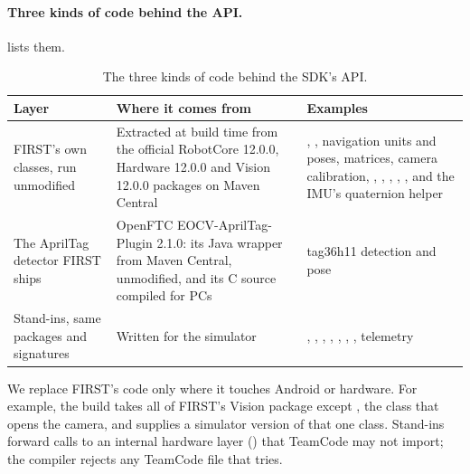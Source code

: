 \documentclass[10pt,twocolumn,letterpaper]{article}
\begin{document}
\paragraph{Three kinds of code behind the API.}  lists them.

\begin{table}[t]
\centering
\small
\caption{The three kinds of code behind the SDK's API.}\label{tab:layers}
\begin{tabularx}{\textwidth}{@{}>{\raggedright\arraybackslash}p{4.2cm}>{\raggedright\arraybackslash}p{5.0cm}L@{}}
\toprule
\textbf{Layer} & \textbf{Where it comes from} & \textbf{Examples} \\
\midrule
FIRST's own classes, run unmodified & Extracted at build time from the official RobotCore 12.0.0, Hardware 12.0.0 and Vision 12.0.0 packages on Maven Central & , , navigation units and poses, matrices, camera calibration, , , , , ,  and the IMU's quaternion helper \\
The AprilTag detector FIRST ships & OpenFTC EOCV-AprilTag-Plugin 2.1.0: its Java wrapper from Maven Central, unmodified, and its C source compiled for PCs \citep{openftc2026apriltag} & tag36h11 detection and pose \\
Stand-ins, same packages and signatures & Written for the simulator & , , , , , , , telemetry \\
\bottomrule
\end{tabularx}
\end{table}

We replace FIRST's code only where it touches Android or hardware. For example, the build takes all of FIRST's Vision package except , the class that opens the camera, and supplies a simulator version of that one class. Stand-ins forward calls to an internal hardware layer () that TeamCode may not import; the compiler rejects any TeamCode file that tries.
\end{document}
